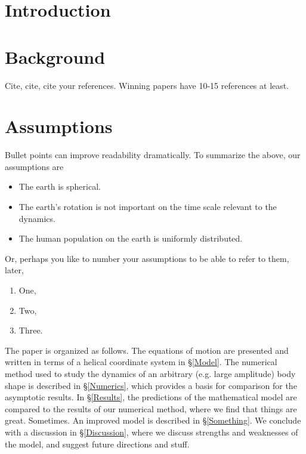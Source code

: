 \documentclass[pre,12pt]{revtex4-1}
\begin{document}
\newpage

\section{Introduction}\label{Introduction}

\section{Background}\label{Background}


Cite, cite, cite your references. Winning papers have 10-15 references at least. 

\section{Assumptions}\label{Assumptions}

Bullet points can improve readability dramatically. To summarize the above, our assumptions are 

\begin{itemize}
\item The earth is spherical.
\item The earth's rotation is not important on the time scale relevant to the dynamics.
\item The human population on the earth is uniformly distributed. 
\end{itemize}

Or, perhaps you like to number your assumptions to be able to refer to them, later, 

\begin{enumerate}
\item One,
\item Two,
\item Three. 
\end{enumerate}

The paper is organized as follows. The equations of motion are presented and written in terms of a helical coordinate system in \S\ref{Model}. The numerical method used to study the dynamics of an arbitrary (e.g. large amplitude) body shape is described in \S\ref{Numerics}, which provides a basis for comparison for the asymptotic results. In \S\ref{Results}, the predictions of the mathematical model are compared to the results of our numerical method, where we find that things are great. Sometimes. An improved model is described in \S\ref{Something}. We conclude with a discussion in \S\ref{Discussion}, where we discuss strengths and weaknesses of the model, and suggest future directions and stuff.
\end{document}
